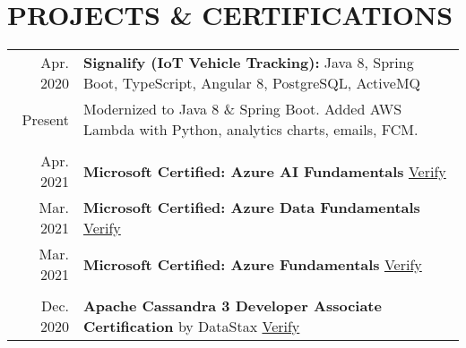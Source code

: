 \documentclass[a4paper, 10pt]{article}
\begin{document}
\section{PROJECTS \& CERTIFICATIONS}
\begin{tabular}{r p{15.7cm}}
    Apr. 2020 &  \textbf{Signalify (IoT Vehicle Tracking):} Java 8, Spring Boot, TypeScript, Angular 8, PostgreSQL, ActiveMQ\\
    Present & Modernized to Java 8 \& Spring Boot. Added AWS Lambda with Python, analytics charts, emails, FCM.\\\\
    Apr. 2021 & \textbf{Microsoft Certified: Azure AI Fundamentals} \hspace{0.5em} \href{https://www.credly.com/badges/b96505f9-33f9-47e0-91bd-2c8fd73ecffb}{Verify}\\
    Mar. 2021 & \textbf{Microsoft Certified: Azure Data Fundamentals} \hspace{0.5em} \href{https://www.credly.com/badges/3cc1890b-1881-48c4-9c25-d960e14fbdee}{Verify}\\
    Mar. 2021 & \textbf{Microsoft Certified: Azure Fundamentals} \hspace{0.5em} \href{https://www.credly.com/badges/18da888a-9cbd-49d8-b923-7c7fe752fbab}{Verify}\\\\
    Dec. 2020 & \textbf{Apache Cassandra 3 Developer Associate Certification} by DataStax \hspace{0.5em} \href{https://certification.mettl.com/datastax/applicant/result/download-certificate?key=v2gAI\%2BtQJaGeWin6S7cSag\%3D\%3D}{Verify}
\end{tabular}
\end{document}
